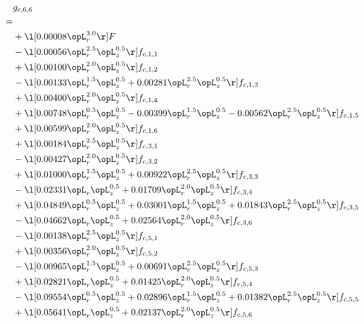 \begin{alignat}{2} 
\label{eq:g_66_0} 
& g_{c,6,6} \nonumber \\ 
 = \\ 
& + \l[  0.00008 \opL_r^{3.0}  \r] F \nonumber \\ 
& - \l[  0.00056 \opL_r^{2.5} \opL_z^{0.5}  \r] f_{c,1,1} \nonumber \\ 
& + \l[  0.00100 \opL_r^{2.0} \opL_z^{0.5}  \r] f_{c,1,2} \nonumber \\ 
& - \l[  0.00133 \opL_r^{1.5} \opL_z^{0.5} +  0.00281 \opL_r^{2.5} \opL_z^{0.5}  \r] f_{c,1,3} \nonumber \\ 
& + \l[  0.00400 \opL_r^{2.0} \opL_z^{0.5}  \r] f_{c,1,4} \nonumber \\ 
& + \l[  0.00748 \opL_r^{0.5} \opL_z^{0.5}   -0.00399 \opL_r^{1.5} \opL_z^{0.5}   -0.00562 \opL_r^{2.5} \opL_z^{0.5}  \r] f_{c,1,5} \nonumber \\ 
& + \l[  0.00599 \opL_r^{2.0} \opL_z^{0.5}  \r] f_{c,1,6} \nonumber \\ 
& + \l[  0.00184 \opL_r^{2.5} \opL_z^{0.5}  \r] f_{c,3,1} \nonumber \\ 
& - \l[  0.00427 \opL_r^{2.0} \opL_z^{0.5}  \r] f_{c,3,2} \nonumber \\ 
& + \l[  0.01000 \opL_r^{1.5} \opL_z^{0.5} +  0.00922 \opL_r^{2.5} \opL_z^{0.5}  \r] f_{c,3,3} \nonumber \\ 
& - \l[  0.02331 \opL_r \opL_z^{0.5} +  0.01709 \opL_r^{2.0} \opL_z^{0.5}  \r] f_{c,3,4} \nonumber \\ 
& + \l[  0.04849 \opL_r^{0.5} \opL_z^{0.5} +  0.03001 \opL_r^{1.5} \opL_z^{0.5} +  0.01843 \opL_r^{2.5} \opL_z^{0.5}  \r] f_{c,3,5} \nonumber \\ 
& - \l[  0.04662 \opL_r \opL_z^{0.5} +  0.02564 \opL_r^{2.0} \opL_z^{0.5}  \r] f_{c,3,6} \nonumber \\ 
& - \l[  0.00138 \opL_r^{2.5} \opL_z^{0.5}  \r] f_{c,5,1} \nonumber \\ 
& + \l[  0.00356 \opL_r^{2.0} \opL_z^{0.5}  \r] f_{c,5,2} \nonumber \\ 
& - \l[  0.00965 \opL_r^{1.5} \opL_z^{0.5} +  0.00691 \opL_r^{2.5} \opL_z^{0.5}  \r] f_{c,5,3} \nonumber \\ 
& + \l[  0.02821 \opL_r \opL_z^{0.5} +  0.01425 \opL_r^{2.0} \opL_z^{0.5}  \r] f_{c,5,4} \nonumber \\ 
& - \l[  0.09554 \opL_r^{0.5} \opL_z^{0.5} +  0.02896 \opL_r^{1.5} \opL_z^{0.5} +  0.01382 \opL_r^{2.5} \opL_z^{0.5}  \r] f_{c,5,5} \nonumber \\ 
& + \l[  0.05641 \opL_r \opL_z^{0.5} +  0.02137 \opL_r^{2.0} \opL_z^{0.5}  \r] f_{c,5,6} \nonumber \\ 
\end{alignat} 



